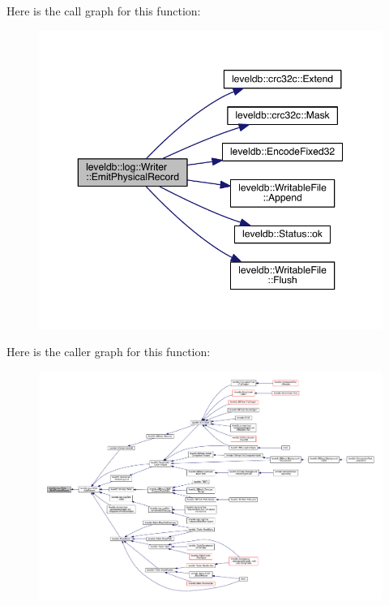 Here is the call graph for this function\+:\nopagebreak
\begin{figure}[H]
\begin{center}
\leavevmode
\includegraphics[width=350pt]{classleveldb_1_1log_1_1_writer_a0ca13201d9f4aa2231a1144bad4f1908_cgraph}
\end{center}
\end{figure}




Here is the caller graph for this function\+:
\nopagebreak
\begin{figure}[H]
\begin{center}
\leavevmode
\includegraphics[width=350pt]{classleveldb_1_1log_1_1_writer_a0ca13201d9f4aa2231a1144bad4f1908_icgraph}
\end{center}
\end{figure}


